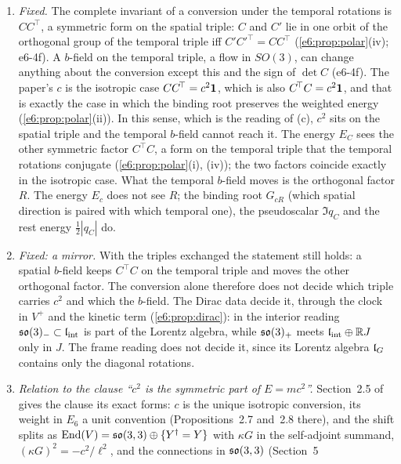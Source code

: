 \begin{remark}
\label{e6:rem:csym}
\begin{enumerate}[label=(\alph*),leftmargin=2.2em]
\item \emph{Fixed.} The complete invariant of a conversion under the temporal rotations is $CC^{\!\top}$, a symmetric form on the spatial triple:
$C$ and $C'$ lie in one orbit of the orthogonal group of the temporal triple iff $C'C'^{\!\top}=CC^{\!\top}$ (\cref{e6:prop:polar}(iv); e6-4f). A $b$-field on the temporal triple,
a flow in $SO(3)$, can change anything about the conversion except this and the sign of $\det C$ (e6-4f). The paper's $c$ is the isotropic case $CC^{\!\top}=c^2\mathbf 1$, which is also $C^{\!\top}C=c^2\mathbf 1$, and that
is exactly the case in which the binding root preserves the weighted energy (\cref{e6:prop:polar}(ii)). In this sense, which is the reading of (c),
$c^2$ sits on the spatial triple and the temporal $b$-field cannot reach it. The energy $E_C$ sees the other symmetric factor $C^{\!\top}C$, a form on
the temporal triple that the temporal rotations conjugate (\cref{e6:prop:polar}(i), (iv)); the two factors coincide exactly in the isotropic case. What the temporal $b$-field moves is the orthogonal factor $R$. The energy $E_c$ does not see
$R$; the binding root $G_{cR}$ (which spatial direction is paired with which temporal one), the pseudoscalar $\Im q_C$ and the rest energy
$\tfrac12|q_C|$ do.
\item \emph{Fixed: a mirror.} With the triples exchanged the statement still holds: a spatial $b$-field keeps $C^{\!\top}C$ on the temporal triple and
moves the other orthogonal factor. The conversion alone therefore does not decide which triple carries $c^2$ and which the $b$-field. The Dirac data
decide it, through the clock in $V^+$ and the kinetic term (\cref{e6:prop:dirac}): in the interior reading $\mathfrak{so}(3)_-\subset\mathfrak l_{\rm int}$ is part of the
Lorentz algebra, while $\mathfrak{so}(3)_+$ meets $\mathfrak l_{\rm int}\oplus\mathbb{R} J$ only in $J$. The frame reading does not decide it, since its Lorentz algebra $\mathfrak l_G$ contains
only the diagonal rotations.
\item \emph{Relation to the clause ``$c^2$ is the symmetric part of $E=mc^2$''.} Section~2.5 of \cite{RE} gives the clause its exact forms: $c$ is
the unique isotropic conversion, its weight in $E_6$ a unit convention (Propositions~2.7 and~2.8 there), and the shift splits as
$\operatorname{End}(V)=\mathfrak{so}(3,3)\oplus\{Y^\dagger=Y\}$ with $\kappa G$ in the self-adjoint summand, $(\kappa G)^2=-c^2/\ell^2$, and the connections in $\mathfrak{so}(3,3)$ (Section~5

\end{enumerate}
\end{remark}
